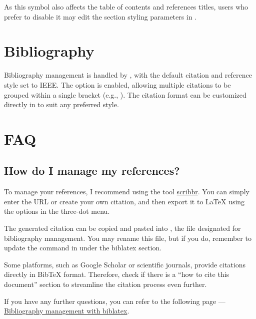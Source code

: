 \documentclass[9pt,a4paper,twocolumn,twoside]{rho-class/rho}
\begin{document}
    As this symbol also affects the table of contents and references titles, users who prefer to disable it may edit the section styling parameters in .

\section{Bibliography}
		
	Bibliography management is handled by , with the default citation and reference style set to IEEE. The  option is enabled, allowing multiple citations to be grouped within a single bracket (e.g., \cite{davis2023signalflow,bell2022codefont}). The citation format can be customized directly in  to suit any preferred style.

\section*{FAQ}

    \subsection*{How do I manage my references?}
        
        To manage your references, I recommend using the tool \href{https://www.scribbr.es/citar/generador/folders/73QOXYsCwMRu4ifQaN65mx/lists/msTfx7GJjIAOUkufbISnA/}{scribbr}. You can simply enter the URL or create your own citation, and then export it to \LaTeX{} using the options in the three-dot menu.
            
        The generated citation can be copied and pasted into , the file designated for bibliography management. You may rename this file, but if you do, remember to update the \inlinecode{} command in  under the biblatex section.
    
        \begin{note}
            Some platforms, such as Google Scholar or scientific journals, provide citations directly in BibTeX format. Therefore, check if there is a ``how to cite this document'' section to streamline the citation process even further.
        \end{note}

        If you have any further questions, you can refer to the following page — \href{https://es.overleaf.com/learn/latex/Bibliography_management_with_biblatex}{Bibliography management with biblatex}.
        
\end{document}
